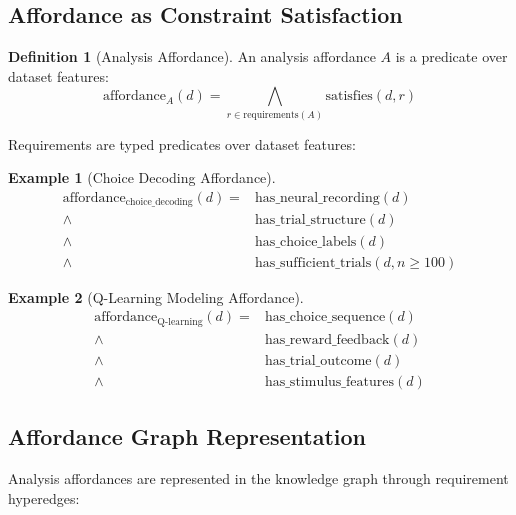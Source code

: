 \documentclass{article}
\theoremstyle{definition}
\newtheorem{definition}{Definition}[section]
\newtheorem{example}{Example}[section]
\begin{document}
\subsection{Affordance as Constraint Satisfaction}

\begin{definition}[Analysis Affordance]
\label{def:affordance}
An analysis affordance $A$ is a predicate over dataset features:
\begin{equation}
\text{affordance}_A(d) = \bigwedge_{r \in \text{requirements}(A)} \text{satisfies}(d, r)
\end{equation}
\end{definition}

Requirements are typed predicates over dataset features:

\begin{example}[Choice Decoding Affordance]
\begin{equation}
\begin{split}
\text{affordance}_{\text{choice\_decoding}}(d) = &\text{has\_neural\_recording}(d) \\
\land &\text{has\_trial\_structure}(d) \\
\land &\text{has\_choice\_labels}(d) \\
\land &\text{has\_sufficient\_trials}(d, n \geq 100)
\end{split}
\end{equation}
\end{example}

\begin{example}[Q-Learning Modeling Affordance]
\begin{equation}
\begin{split}
\text{affordance}_{\text{Q-learning}}(d) = &\text{has\_choice\_sequence}(d) \\
\land &\text{has\_reward\_feedback}(d) \\
\land &\text{has\_trial\_outcome}(d) \\
\land &\text{has\_stimulus\_features}(d)
\end{split}
\end{equation}
\end{example}

\subsection{Affordance Graph Representation}

Analysis affordances are represented in the knowledge graph through requirement hyperedges:
\end{document}
